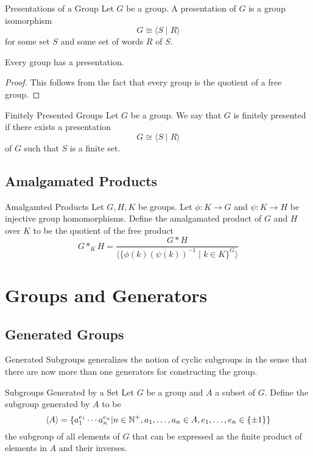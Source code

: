 \documentclass[a4paper]{article}
\begin{document}
\begin{defn}{Presentations of a Group}{} Let $G$ be a group. A presentation of $G$ is a group isomorphism $$G\cong\langle S\;|\;R\rangle$$ for some set $S$ and some set of words $R$ of $S$. 
\end{defn}

\begin{prp}{}{} Every group has a presentation. \tcbline
\begin{proof}
This follows from the fact that every group is the quotient of a free group. 
\end{proof}
\end{prp}

\begin{defn}{Finitely Presented Groups}{} Let $G$ be a group. We say that $G$ is finitely presented if there exists a presentation $$G\cong\langle S\;|\;R\rangle$$ of $G$ such that $S$ is a finite set. 
\end{defn}

\subsection{Amalgamated Products}
\begin{defn}{Amalgamted Products}{} Let $G,H,K$ be groups. Let $\phi:K\to G$ and $\psi:K\to H$ be injective group homomorphisms. Define the amalgamated product of $G$ and $H$ over $K$ to be the quotient of the free product $$G\ast_KH=\frac{G\ast H}{\langle\{\phi(k)(\psi(k))^{-1}\;|\;k\in K\}^G\rangle}$$
\end{defn}

\pagebreak
\section{Groups and Generators}
\subsection{Generated Groups}
Generated Subgroups generalizes the notion of cyclic subgroups in the sense that there are now more than one generators for constructing the group. 

\begin{defn}{Subgroups Generated by a Set}{} Let $G$ be a group and $A$ a subset of $G$. Define the subgroup generated by $A$ to be $$\langle A\rangle=\{a_1^{e_1}\cdots a_n^{e_n}|n\in\mathbb{N}^+, a_1,\dots,a_n\in A, e_1,\dots,e_n\in\{\pm1\}\}$$ the subgroup of all elements of $G$ that can be expressed as the finite product of elements in $A$ and their inverses. 
\end{defn}
\end{document}
